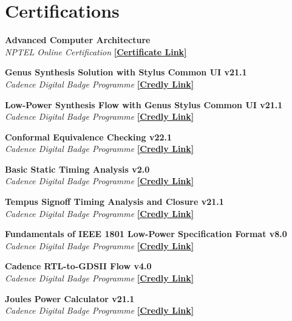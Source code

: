 \section{\sc Certifications}

{\bf{Advanced Computer Architecture }} \\
\textit{NPTEL Online Certification}
\href{https://archive.nptel.ac.in/content/noc/NOC23/SEM1/Ecertificates/106/noc23-cs07/Course/NPTEL23CS07S5323401304248775.jpg}{{\bf[Certificate Link]}}


{\bf{Genus Synthesis Solution with Stylus Common UI v21.1}} \\
\textit{Cadence Digital Badge Programme} 
\href{https://www.credly.com/badges/fc9243f2-ca59-4cf6-b2a0-4f01a284d005}{{\bf[Credly Link]}}

{\bf{Low-Power Synthesis Flow with Genus Stylus Common UI v21.1}} \\
\textit{Cadence Digital Badge Programme} 
\href{https://www.credly.com/badges/574c0d1c-5e5f-4b63-bbec-34bf15f34715}{{\bf[Credly Link]}}

{\bf{Conformal Equivalence Checking v22.1}} \\
\textit{Cadence Digital Badge Programme} 
\href{https://www.credly.com/badges/5662fd4d-f91e-4f24-9ff9-030c9c8a806e}{{\bf[Credly Link]}}

{\bf{Basic Static Timing Analysis v2.0}} \\
\textit{Cadence Digital Badge Programme} 
\href{https://www.credly.com/badges/a86a351b-9722-4ee5-8fe0-0ac785ead4e7}{{\bf[Credly Link]}}

{\bf{Tempus Signoff Timing Analysis and Closure v21.1}} \\
\textit{Cadence Digital Badge Programme} 
\href{https://www.credly.com/badges/233a9c95-dda6-4e62-af14-dd33d5e06c6d}{{\bf[Credly Link]}}

{\bf{Fundamentals of IEEE 1801 Low-Power Specification Format v8.0}} \\
\textit{Cadence Digital Badge Programme} 
\href{https://www.credly.com/badges/76d37ce1-0283-4ce9-b084-7f8a1c5ceb2e}{{\bf[Credly Link]}}

{\bf{Cadence RTL-to-GDSII Flow v4.0}} \\
\textit{Cadence Digital Badge Programme} 
\href{https://www.credly.com/badges/fca2b565-9ed0-4791-a0b7-0f0ff65f79da}{{\bf[Credly Link]}}

{\bf{Joules Power Calculator v21.1}} \\
\textit{Cadence Digital Badge Programme} 
\href{https://www.credly.com/badges/93a74be8-6d4e-495e-9af2-48a953915f6a}{{\bf[Credly Link]}}

\endinput
